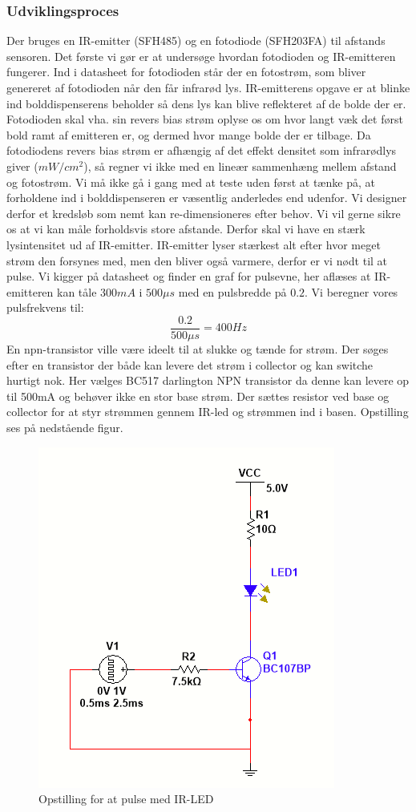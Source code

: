\documentclass[HardwareDesign/HardwareDesign_main.tex]{subfiles}
\begin{document}
\subsubsection{Udviklingsproces}
Der bruges en IR-emitter (SFH485) og en fotodiode (SFH203FA) til afstands sensoren. Det første vi gør er at undersøge hvordan fotodioden og IR-emitteren fungerer. Ind i datasheet for fotodioden står der en fotostrøm, som bliver genereret af fotodioden når den får infrarød lys. IR-emitterens opgave er at blinke ind bolddispenserens beholder så dens lys kan blive reflekteret af de bolde der er. Fotodioden skal vha. sin revers bias strøm oplyse os om hvor langt væk det først bold ramt af emitteren er, og dermed hvor mange bolde der er tilbage. Da fotodiodens revers bias strøm er afhængig af det effekt densitet som infrarødlys giver ($mW/cm^2$), så regner vi ikke med en lineær sammenhæng mellem afstand og fotostrøm.
Vi må ikke gå i gang med at teste uden først at tænke på, at forholdene ind i bolddispenseren er væsentlig anderledes end udenfor. Vi designer derfor et kredsløb som nemt kan re-dimensioneres efter behov. Vi vil gerne sikre os at vi kan måle forholdsvis store afstande. Derfor skal vi have en stærk lysintensitet ud af IR-emitter. IR-emitter lyser stærkest alt efter hvor meget strøm den forsynes med, men den bliver også varmere, derfor er vi nødt til at pulse. Vi kigger på datasheet og finder en graf for pulsevne, her aflæses at IR-emitteren kan tåle $300mA$ i $500\mu s$ med en pulsbredde på $0.2$. Vi beregner vores pulsfrekvens til:
\[\frac{0.2}{500\mu s}=400Hz\]
En npn-transistor ville være ideelt til at slukke og tænde for strøm. Der søges efter en transistor der både kan levere det strøm i collector og kan switche hurtigt nok. Her vælges BC517 darlington NPN transistor da denne kan levere op til 500mA og behøver ikke en stor base strøm. Der sættes resistor ved base og collector for at styr strømmen gennem IR-led og strømmen ind i basen. Opstilling ses på nedstående figur.
\newpage
\begin{figure}
    \centering
    \includegraphics{HardwareDesign/Bolddispenser/graphics/Opstilling1.png}
    \caption{Opstilling for at pulse med IR-LED}
    \label{fig:IRLEDpuls}
\end{figure}
\end{document}
